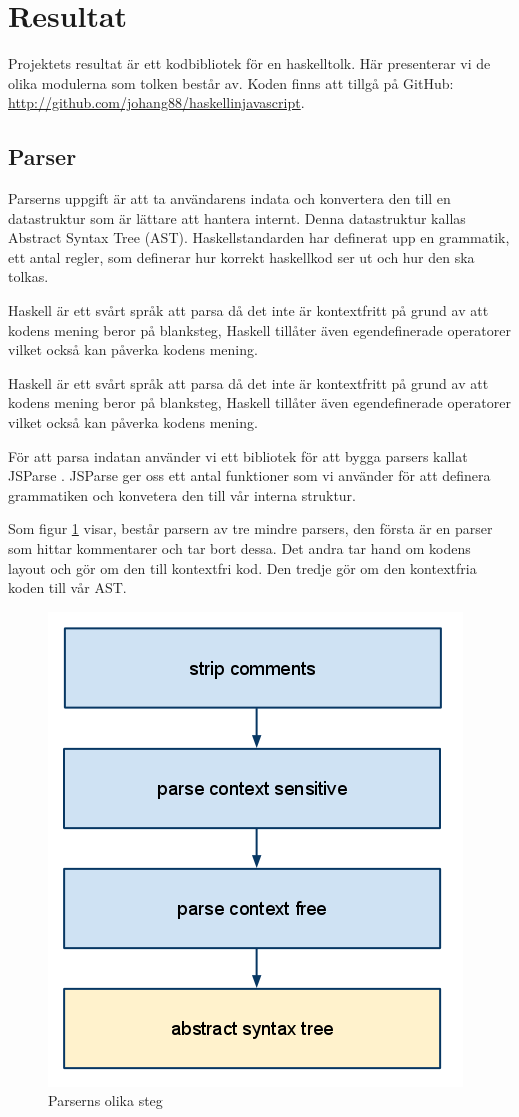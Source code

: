 \section{Resultat}

Projektets resultat är ett kodbibliotek för en haskelltolk. Här presenterar vi de olika modulerna som tolken består av. Koden finns att tillgå på GitHub: \url{http://github.com/johang88/haskellinjavascript}.

\subsection{Parser} 
Parserns uppgift är att ta användarens indata och konvertera den till en datastruktur 
som är lättare att hantera internt. Denna datastruktur kallas Abstract Syntax Tree (AST). 
Haskellstandarden har definerat upp en grammatik, ett antal regler, som definerar hur korrekt haskellkod ser ut och hur den ska tolkas.

Haskell är ett svårt språk att parsa då det inte är kontextfritt på grund av att kodens mening beror på blanksteg, 
Haskell tillåter även egendefinerade operatorer vilket också kan påverka kodens mening. 

Haskell är ett svårt språk att parsa då det inte är kontextfritt på grund av att kodens mening beror på blanksteg, 
Haskell tillåter även egendefinerade operatorer vilket också kan påverka kodens mening. 

För att parsa indatan använder vi ett bibliotek för att bygga parsers kallat JSParse \citep{jsparse}.
JSParse ger oss ett antal funktioner som vi använder för att definera grammatiken och konvetera den till vår interna struktur.

Som figur \ref{fig:parser_steg} visar, består parsern av tre mindre parsers, den första är en parser som hittar kommentarer och tar bort dessa. 
Det andra tar hand om kodens layout och gör om den till kontextfri kod. Den tredje gör om den kontextfria koden till vår AST.

\begin{figure}[H]
    \begin{center}
        \includegraphics[width=.5\textwidth]{parser_1.png}
        \caption{Parserns olika steg}
        \label{fig:parser_steg} %
    \end{center}
\end{figure}

